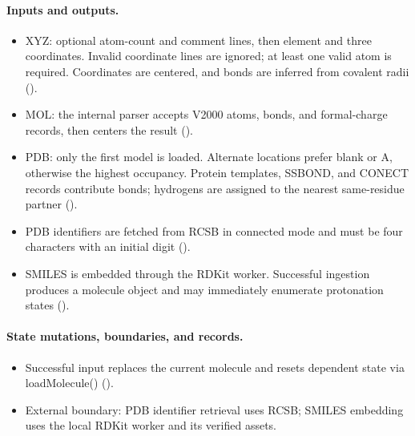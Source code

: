 \documentclass[11pt]{article}
\begin{document}
\begin{small}
\paragraph{Inputs and outputs.}

\begin{itemize}[leftmargin=*]

\item XYZ: optional atom-count and comment lines, then element and three coordinates. Invalid coordinate lines are ignored; at least one valid atom is required. Coordinates are centered, and bonds are inferred from covalent radii ().

\item MOL: the internal parser accepts V2000 atoms, bonds, and formal-charge records, then centers the result ().

\item PDB: only the first model is loaded. Alternate locations prefer blank or A, otherwise the highest occupancy. Protein templates, SSBOND, and CONECT records contribute bonds; hydrogens are assigned to the nearest same-residue partner ().

\item PDB identifiers are fetched from RCSB in connected mode and must be four characters with an initial digit ().

\item SMILES is embedded through the RDKit worker. Successful ingestion produces a molecule object and may immediately enumerate protonation states ().

\end{itemize}

\paragraph{State mutations, boundaries, and records.}

\begin{itemize}[leftmargin=*]

\item Successful input replaces the current molecule and resets dependent state via loadMolecule() ().

\item External boundary: PDB identifier retrieval uses RCSB; SMILES embedding uses the local RDKit worker and its verified assets.


\end{itemize}
\end{small}
\end{document}
